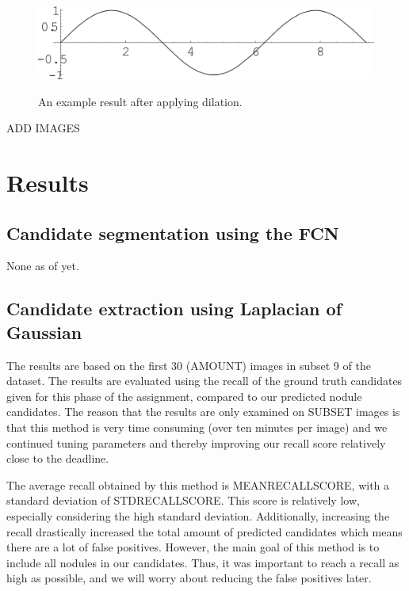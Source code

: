 \documentclass{article}
\begin{document}
\begin{itemize}
	\begin{figure}[h]
	\centering
	{\includegraphics[width=0.7\linewidth]{./figure.png}}
	\caption{An example result after applying dilation. \label{figure:dilationresult}}
	\end{figure}
\end{itemize}
ADD IMAGES


\section{Results}\label{sec:results}
\subsection{Candidate segmentation using the FCN}
None as of yet.

\subsection{Candidate extraction using Laplacian of Gaussian}
The results are based on the first 30 (AMOUNT) images in subset 9 of the dataset. The results are evaluated using the recall of the ground truth candidates given for this phase of the assignment, compared to our predicted nodule candidates. The reason that the results are only examined on SUBSET images is that this method is very time consuming (over ten minutes per image) and we continued tuning parameters and thereby improving our recall score relatively close to the deadline.

The average recall obtained by this method is MEANRECALLSCORE, with a standard deviation of STDRECALLSCORE. This score is relatively low, especially considering the high standard deviation. Additionally, increasing the recall drastically increased the total amount of predicted candidates which means there are a lot of false positives. However, the main goal of this method is to include all nodules in our candidates. Thus, it was important to reach a recall as high as possible, and we will worry about reducing the false positives later.
\end{document}
